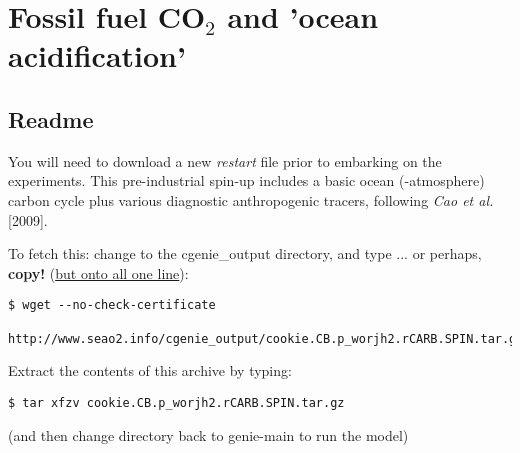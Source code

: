 
\cleardoublepage


\chapter{Fossil fuel CO$_{2}$ and 'ocean acidification'}\label{ch:fossil-fuel-co2}

\hfill \break

\newpage

\section*{Readme}

You will need to download a new \textit{restart} file prior to embarking on the experiments. This pre-industrial spin-up includes a basic ocean (-atmosphere) carbon cycle plus various diagnostic anthropogenic tracers, following \textit{Cao et al.} [2009].

\vspace{2mm}

\noindent To fetch this: change to the \textsf{\footnotesize cgenie\_output} directory, and type ... or perhaps, \textbf{copy!} (\uline{but onto all one line}):
\vspace{-2mm}
\begin{verbatim}
$ wget --no-check-certificate 
   http://www.seao2.info/cgenie_output/cookie.CB.p_worjh2.rCARB.SPIN.tar.gz
\end{verbatim}
\vspace{-2mm}

\noindent Extract the contents of this archive by typing:
\vspace{-2mm}
\begin{verbatim}
$ tar xfzv cookie.CB.p_worjh2.rCARB.SPIN.tar.gz
\end{verbatim}
\vspace{-2mm}
\noindent (and then change directory back to \textsf{\footnotesize genie-main} to run the model)

\newpage

